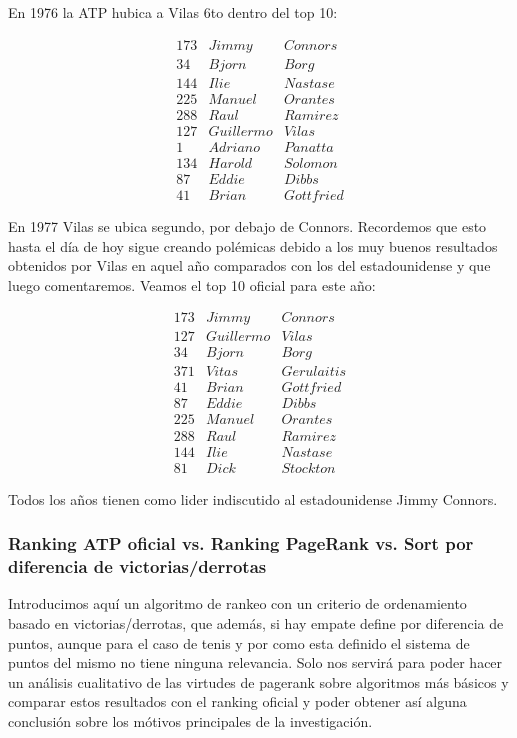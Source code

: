 En 1976 la ATP hubica a Vilas 6to dentro del top 10:

\begin{eqnarray*}
173 & Jimmy & Connors \\
34 & Bjorn & Borg \\
144 & Ilie & Nastase \\
225 & Manuel & Orantes \\
288 & Raul & Ramirez \\
127 & Guillermo & Vilas \\
1 & Adriano & Panatta \\
134 & Harold & Solomon \\
87 & Eddie & Dibbs \\
41 & Brian & Gottfried 
\end{eqnarray*}

En 1977 Vilas se ubica segundo, por debajo de Connors. Recordemos que esto hasta el día de hoy sigue creando polémicas debido a los muy buenos resultados obtenidos por Vilas en aquel año comparados con los del estadounidense y que luego comentaremos.
Veamos el top 10 oficial para este año:

\begin{eqnarray*}
173 & Jimmy & Connors \\
127 & Guillermo & Vilas \\
34 & Bjorn & Borg \\
371 & Vitas & Gerulaitis \\
41 & Brian & Gottfried \\
87 & Eddie & Dibbs \\
225 & Manuel & Orantes \\
288 & Raul & Ramirez \\
144 & Ilie & Nastase \\
81 & Dick & Stockton 
\end{eqnarray*}

Todos los años tienen como lider indiscutido al estadounidense Jimmy Connors.

\subsubsection{Ranking ATP oficial vs. Ranking PageRank vs. Sort por diferencia de victorias/derrotas}

Introducimos aquí un algoritmo de rankeo con un criterio de ordenamiento basado en victorias/derrotas, que además, si hay empate define por diferencia de puntos, aunque para el caso de tenis y por como esta definido el sistema de puntos del mismo no tiene ninguna relevancia. Solo nos servirá para poder hacer un análisis cualitativo de las virtudes de pagerank sobre algoritmos más básicos y comparar estos resultados con el ranking oficial y poder obtener así alguna conclusión sobre los mótivos principales de la investigación.

